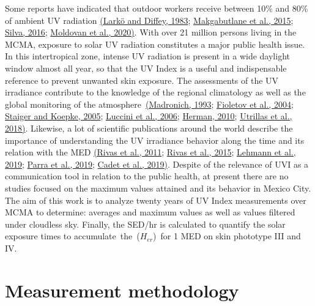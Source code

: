 \documentclass[10pt]{article}
\begin{document}
Some reports have indicated that outdoor workers receive between 10\%
and 80\% of ambient UV radiation \hyperref[csl:50]{(Larkö and Diffey, 1983}; \hyperref[csl:51]{Makgabutlane et al., 2015}; \hyperref[csl:52]{Silva, 2016}; \hyperref[csl:53]{Moldovan et al., 2020)}. With over 21
million persons living in the MCMA, exposure to solar UV radiation
constitutes a major public health issue. In this intertropical zone,
intense UV radiation is present in a wide daylight window almost all
year, so that the UV Index is a useful and indispensable reference to
prevent unwanted skin exposure. The assessments of the UV irradiance
contribute to the knowledge of the regional climatology as well as the
global monitoring of the atmosphere~\hyperref[csl:54]{(Madronich, 1993}; \hyperref[csl:55]{Fioletov et al., 2004}; \hyperref[csl:56]{Staiger and Koepke, 2005}; \hyperref[csl:57]{Luccini et al., 2006}; \hyperref[csl:28]{Herman, 2010}; \hyperref[csl:58]{Utrillas et al., 2018)}. Likewise, a lot
of scientific publications around the world describe the importance of
understanding the UV irradiance behavior along the time and its relation
with the MED \hyperref[csl:59]{(Rivas et al., 2011}; \hyperref[csl:60]{Rivas et al., 2015}; \hyperref[csl:32]{Lehmann et al., 2019}; \hyperref[csl:61]{Parra et al., 2019}; \hyperref[csl:62]{Cadet et al., 2019)}. Despite of the relevance of UVI as a
communication tool in relation to the public health, at present there
are no studies focused on the maximum values attained and its behavior
in Mexico City. The aim of this work is to analyze twenty years of UV
Index measurements over MCMA to determine: averages and maximum values
as well as values filtered under cloudless sky. Finally, the SED/hr is
calculated to quantify the solar exposure times to
accumulate~the~(\(H_{er}\))~for 1 MED on skin phototype III and
IV.
\section*{Measurement methodology}
{\label{321063}}
\end{document}
